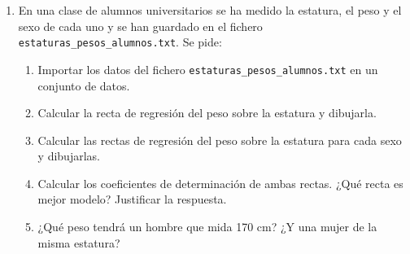 \begin{enumerate}[leftmargin=*]
\item En una clase de alumnos universitarios se ha medido la estatura, el peso y el sexo de cada uno y se han guardado
en el fichero \texttt{estaturas\_pesos\_alumnos.txt}. Se pide:
\begin{enumerate}
\item Importar los datos del fichero \texttt{estaturas\_pesos\_alumnos.txt} en un conjunto de datos.
\item Calcular la recta de regresión del peso sobre la estatura y dibujarla.
\item Calcular las rectas de regresión del peso sobre la estatura para cada sexo y dibujarlas.
\item Calcular los coeficientes de determinación de ambas rectas. ¿Qué recta es mejor modelo? Justificar la respuesta.
\item ¿Qué peso tendrá un hombre que mida 170 cm? ¿Y una mujer de la misma estatura?
\end{enumerate}

\end{enumerate}
